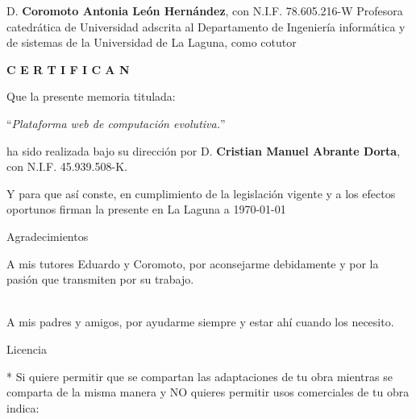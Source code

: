 \documentclass[spanish,a4paper,12pt,oneside]{extreport}
\begin{document}
\bigskip
D. {\bf Coromoto Antonia León Hernández}, con N.I.F. 78.605.216-W
Profesora catedrática de Universidad
adscrita al Departamento
de Ingeniería informática y de sistemas
de la Universidad de La Laguna, como cotutor

\bigskip
\bigskip
{\bf C E R T I F I C A N}

\bigskip
\bigskip
\bigskip
Que la presente memoria titulada:

\bigskip
``{\it Plataforma web de computación evolutiva.}''

\bigskip
\bigskip
\bigskip

\noindent ha sido realizada bajo su dirección por D. {\bf Cristian Manuel Abrante Dorta},
con N.I.F. 45.939.508-K.

\bigskip
\bigskip

Y para que así conste, en cumplimiento de la legislación vigente y a los efectos
oportunos firman la presente en La Laguna a \today

\newpage
\thispagestyle{empty}

{ \flushright

\begin{LARGE}
Agradecimientos
\end{LARGE}

\hspace{3mm}

\begin{large}


\hspace{3mm}
A mis tutores Eduardo y Coromoto, por aconsejarme debidamente y por la pasión que transmiten por su trabajo.

\hspace{3mm}
\hspace{3mm} \\
A mis padres y amigos, por ayudarme siempre y estar ahí cuando los necesito.


\end{large}

}

\newpage

\begin{huge}
Licencia
\end{huge}

\bigskip
* Si quiere permitir que se compartan las adaptaciones de tu obra mientras se comparta de la misma manera
y NO quieres permitir usos comerciales de tu obra indica:
\end{document}
